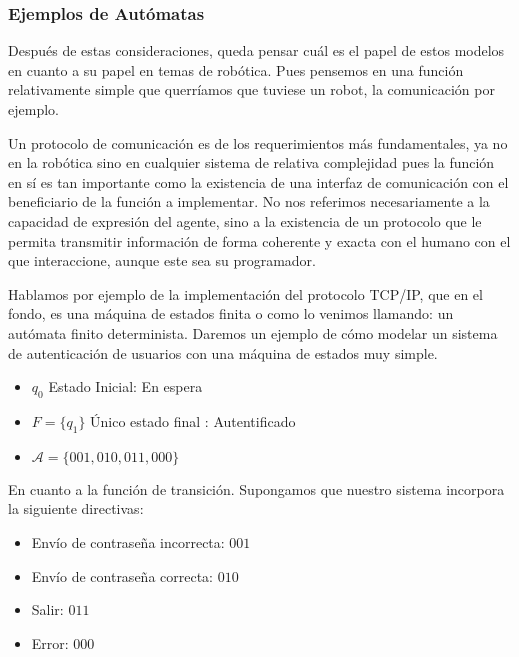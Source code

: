 \subsubsection{Ejemplos de Autómatas}

Después de estas consideraciones, queda pensar cuál es el papel de estos modelos en cuanto a su papel en temas de robótica. Pues pensemos en una función relativamente simple que querríamos que tuviese un robot, la comunicación por ejemplo.

\vspace{10px}

Un protocolo de comunicación es de los requerimientos más fundamentales, ya no en la robótica sino en cualquier sistema de relativa complejidad pues la función en sí es tan importante como la existencia de una interfaz de comunicación con el beneficiario de la función a implementar. No nos referimos necesariamente a la capacidad de expresión del agente, sino a la existencia de un protocolo que le permita transmitir información de forma coherente y exacta con el humano con el que interaccione, aunque este sea su programador.

\vspace{10px}

Hablamos por ejemplo de la implementación del protocolo TCP/IP, que en el fondo, es una máquina de estados finita o como lo venimos llamando: un autómata finito determinista. Daremos un ejemplo de cómo modelar un sistema de autenticación de usuarios con una máquina de estados muy simple.

\begin{itemize}
	\item $q_0$ Estado Inicial: En espera
	\item $F=\{q_1\}$ Único estado final : Autentificado
	\item $\mathcal{A}=\{001,010,011,000\}$
\end{itemize}

En cuanto a la función de transición. Supongamos que nuestro sistema incorpora la siguiente directivas:

\begin{multicols}{2}
	\begin{itemize}
		\item Envío de contraseña incorrecta: $001$
		\item Envío de contraseña correcta: $010$
		\item Salir: $011$
		\item Error: $000$
	\end{itemize}
\end{multicols}


